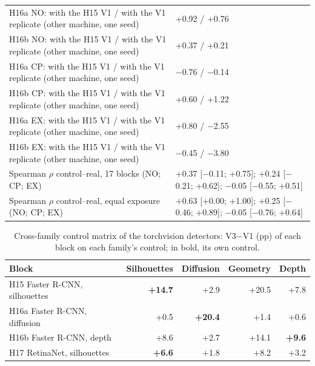 \begin{table}[H]
\begin{tabular}{@{}p{8.6cm} p{6.6cm}@{}}
H16a NO: with the H15 V1 / with the V1 replicate (other machine, one seed) & +0.92 / +0.76 \\
H16b NO: with the H15 V1 / with the V1 replicate (other machine, one seed) & +0.37 / +0.21 \\
H16a CP: with the H15 V1 / with the V1 replicate (other machine, one seed) & $-$0.76 / $-$0.14 \\
H16b CP: with the H15 V1 / with the V1 replicate (other machine, one seed) & +0.60 / +1.22 \\
H16a EX: with the H15 V1 / with the V1 replicate (other machine, one seed) & +0.80 / $-$2.55 \\
H16b EX: with the H15 V1 / with the V1 replicate (other machine, one seed) & $-$0.45 / $-$3.80 \\
Spearman $\rho$ control--real, 17 blocks (NO; CP; EX) & +0.37 [$-$0.11; +0.75]; +0.24 [$-$0.21; +0.62]; $-$0.05 [$-$0.55; +0.51] \\
Spearman $\rho$ control--real, equal exposure (NO; CP; EX) & +0.63 [+0.00; +1.00]; +0.25 [$-$0.46; +0.89]; $-$0.05 [$-$0.76; +0.64] \\
\bottomrule\end{tabular}\end{table}

\begin{table}[H]\centering\scriptsize
\caption{Cross-family control matrix of the torchvision detectors: V3$-$V1 (pp) of each block on each family's control; in bold, its own control.}\label{tab:s-cruzada-tv}
\begin{tabular}{@{}l rrrr@{}}\toprule
Block & Silhouettes & Diffusion & Geometry & Depth \\ \midrule
H15 Faster R-CNN, silhouettes & \textbf{+14.7} & +2.9 & +20.5 & +7.8 \\
H16a Faster R-CNN, diffusion & +0.5 & \textbf{+20.4} & +1.4 & +0.6 \\
H16b Faster R-CNN, depth & +8.6 & +2.7 & +14.1 & \textbf{+9.6} \\
H17 RetinaNet, silhouettes & \textbf{+6.6} & +1.8 & +8.2 & +3.2 \\
\bottomrule\end{tabular}\end{table}

